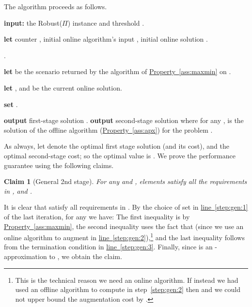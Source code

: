 \documentclass[11pt,letterpaper]{article}
\newcommand{\lref}[2][]{\hyperref[#2]{#1~\ref*{#2}}}
\newtheorem{claim}[theorem]{Claim}
\newenvironment{Myquote}{\par\begingroup
\addtolength{\leftskip}{1em} \rightskip\leftskip }{\par
\endgroup
}
\newenvironment{proof}{

\noindent{\bf Proof:}} {\hfill


}
\def\cov{\ensuremath{\Pi}\xspace}
\def\rcov{{\sf Robust(\cov)}\xspace}
\newcounter{note}[section]
\begin{document}
\begin{proof}
The algorithm proceeds as follows.
\begin{algorithm}
\caption{Algorithm Robust-with-General-Uncertainty-Sets}
  \begin{algorithmic}[1]
\STATE \textbf{input:} the \rcov instance and threshold .

    \STATE \textbf{let} counter , initial online
    algorithm's input , initial online solution
    .

    \REPEAT

       .

    \STATE \label{step:gen:1} \textbf{let}  be the scenario returned by
    the algorithm of \lref[Property]{ass:maxmin} on .

    \STATE \label{step:gen:2} \textbf{let} , and  be the current online solution.

    \UNTIL{} \label{step:gen:3}

\STATE  \textbf{set} .

    \STATE \textbf{output} first-stage solution .
    \STATE \textbf{output} second-stage solution  where for any ,  is the solution of
  the offline algorithm (\lref[Property]{ass:apx}) for the problem .
  \end{algorithmic}
\end{algorithm}


As always, let  denote the optimal first stage solution (and its cost), and  the optimal
  second-stage cost; so the optimal value is . We prove the
  performance guarantee using the following claims.
\begin{Myquote}
\begin{claim}[General 2nd stage]\label{cl:p1}
For any  and , elements  satisfy all the requirements in , and
  .
\end{claim}
\begin{proof}
It is clear that  satisfy all requirements in . By the choice of set  in
\lref[line]{step:gen:1} of the last iteration, for any  we have:
 The first inequality is by \lref[Property]{ass:maxmin}, the second
inequality uses the fact that  (since we use an online algorithm to augment in
\lref[line]{step:gen:2}),\footnote{This is the technical reason we need an online algorithm. If instead we had used an
offline algorithm to compute  in step~\ref{step:gen:2} then  and we could not upper
bound the augmentation cost  by .} and the last inequality follows from
the termination condition in \lref[line]{step:gen:3}. Finally, since  is an -approximation to
, we obtain the claim.
\end{proof}


\end{Myquote}
\end{proof}
\end{document}
